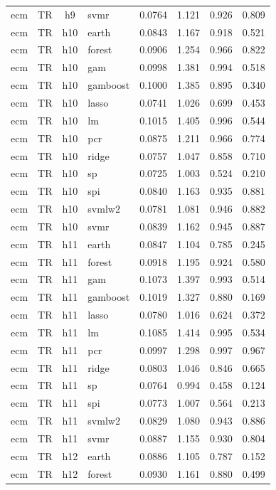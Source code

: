 \begin{ThreePartTable}
\begin{longtable}[t]{llclcccc}
ecm & TR & h9 & svmr & 0.0764 & 1.121 & 0.926 & 0.809\\
\addlinespace
ecm & TR & h10 & earth & 0.0843 & 1.167 & 0.918 & 0.521\\
ecm & TR & h10 & forest & 0.0906 & 1.254 & 0.966 & 0.822\\
ecm & TR & h10 & gam & 0.0998 & 1.381 & 0.994 & 0.518\\
ecm & TR & h10 & gamboost & 0.1000 & 1.385 & 0.895 & 0.340\\
ecm & TR & h10 & lasso & 0.0741 & 1.026 & 0.699 & 0.453\\
ecm & TR & h10 & lm & 0.1015 & 1.405 & 0.996 & 0.544\\
ecm & TR & h10 & pcr & 0.0875 & 1.211 & 0.966 & 0.774\\
ecm & TR & h10 & ridge & 0.0757 & 1.047 & 0.858 & 0.710\\
ecm & TR & h10 & sp & 0.0725 & 1.003 & 0.524 & 0.210\\
ecm & TR & h10 & spi & 0.0840 & 1.163 & 0.935 & 0.881\\
ecm & TR & h10 & svmlw2 & 0.0781 & 1.081 & 0.946 & 0.882\\
ecm & TR & h10 & svmr & 0.0839 & 1.162 & 0.945 & 0.887\\
\addlinespace
ecm & TR & h11 & earth & 0.0847 & 1.104 & 0.785 & 0.245\\
ecm & TR & h11 & forest & 0.0918 & 1.195 & 0.924 & 0.580\\
ecm & TR & h11 & gam & 0.1073 & 1.397 & 0.993 & 0.514\\
ecm & TR & h11 & gamboost & 0.1019 & 1.327 & 0.880 & 0.169\\
ecm & TR & h11 & lasso & 0.0780 & 1.016 & 0.624 & 0.372\\
ecm & TR & h11 & lm & 0.1085 & 1.414 & 0.995 & 0.534\\
ecm & TR & h11 & pcr & 0.0997 & 1.298 & 0.997 & 0.967\\
ecm & TR & h11 & ridge & 0.0803 & 1.046 & 0.846 & 0.665\\
ecm & TR & h11 & sp & 0.0764 & 0.994 & 0.458 & 0.124\\
ecm & TR & h11 & spi & 0.0773 & 1.007 & 0.564 & 0.213\\
ecm & TR & h11 & svmlw2 & 0.0829 & 1.080 & 0.943 & 0.886\\
ecm & TR & h11 & svmr & 0.0887 & 1.155 & 0.930 & 0.804\\
\addlinespace
ecm & TR & h12 & earth & 0.0886 & 1.105 & 0.787 & 0.152\\
ecm & TR & h12 & forest & 0.0930 & 1.161 & 0.880 & 0.499\\

\end{longtable}
\end{ThreePartTable}
